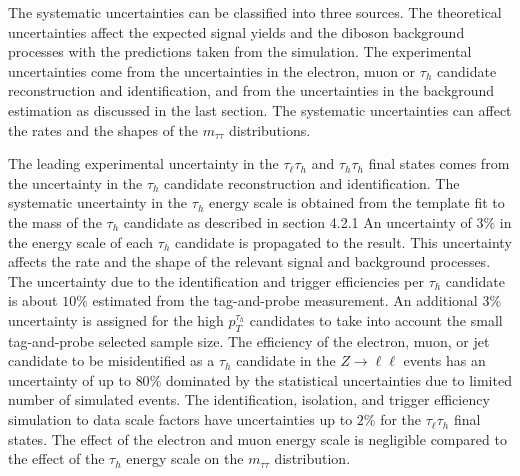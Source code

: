 The systematic uncertainties can be classified into three sources. The theoretical uncertainties affect the expected signal yields and the diboson background processes with the predictions taken from the simulation. The experimental uncertainties come from the uncertainties in the electron, muon or $\tau_h$ candidate reconstruction and identification, and from the uncertainties in the background estimation as discussed in the last section. The systematic uncertainties can affect the rates and the shapes of the $m_{\tau\tau}$ distributions. 

The leading experimental uncertainty in the $\tau_{\ell}\tau_h$ and $\tau_h\tau_h$ final states comes from the uncertainty in the $\tau_h$ candidate reconstruction and identification. The systematic uncertainty in the $\tau_h$ energy scale is obtained from the template fit to the mass of the $\tau_h$ candidate as described in section 4.2.1 An uncertainty of $3\%$ in the energy scale of each $\tau_h$ candidate is propagated to the result. This uncertainty affects the rate and the shape of the relevant signal and background processes. The uncertainty due to the identification and trigger efficiencies per $\tau_h$ candidate is about $10\%$ estimated from the tag-and-probe measurement. An additional $3\%$ uncertainty is assigned for the high $p_{T}^{\tau_h}$ candidates to take into account the small tag-and-probe selected sample size. The efficiency of the electron, muon, or jet candidate to be misidentified as a $\tau_h$ candidate in the $Z\rightarrow\ell\ell$ events has an uncertainty of up to $80\%$ dominated by the statistical uncertainties due to limited number of simulated events. The identification, isolation, and trigger efficiency simulation to data scale factors have uncertainties up to $2\%$ for the $\tau_{\ell}\tau_h$ final states. The effect of the electron and muon energy scale is negligible compared to the effect of the $\tau_h$ energy scale on the $m_{\tau\tau}$ distribution. 
